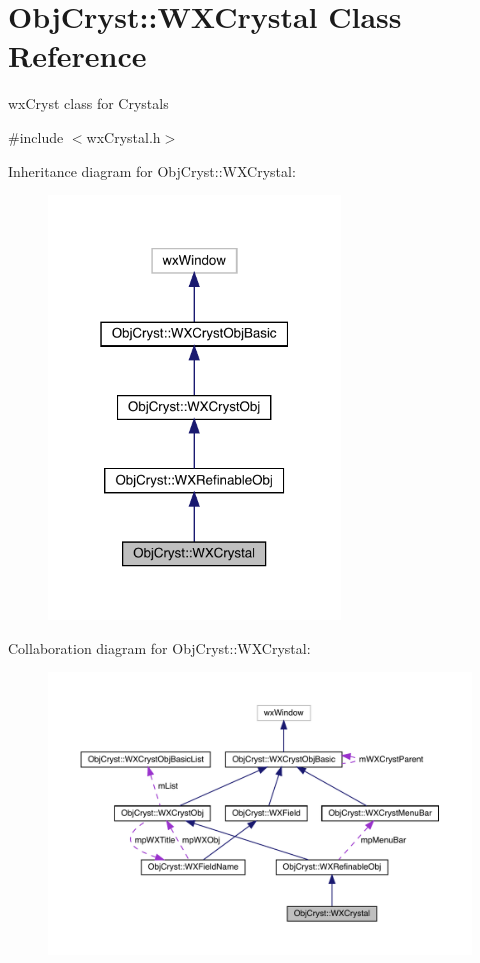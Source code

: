 \hypertarget{class_obj_cryst_1_1_w_x_crystal}{}\section{Obj\+Cryst\+::W\+X\+Crystal Class Reference}
\label{class_obj_cryst_1_1_w_x_crystal}


wx\+Cryst class for Crystals  




{\ttfamily \#include $<$wx\+Crystal.\+h$>$}



Inheritance diagram for Obj\+Cryst\+::W\+X\+Crystal\+:
\nopagebreak
\begin{figure}[H]
\begin{center}
\leavevmode
\includegraphics[width=220pt]{class_obj_cryst_1_1_w_x_crystal__inherit__graph}
\end{center}
\end{figure}


Collaboration diagram for Obj\+Cryst\+::W\+X\+Crystal\+:
\nopagebreak
\begin{figure}[H]
\begin{center}
\leavevmode
\includegraphics[width=350pt]{class_obj_cryst_1_1_w_x_crystal__coll__graph}
\end{center}
\end{figure}
